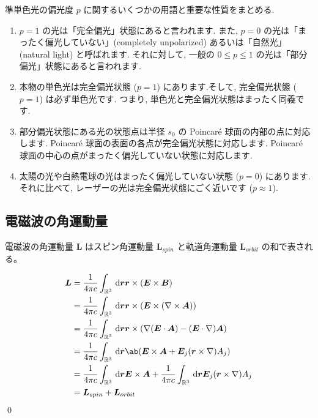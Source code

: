\documentclass[uplatex,dvipdfmx,a4paper,11pt]{jlreq}
\makeatletter
\newcommand{\RR}{\mathbb{R}}
\newcommand{\EE}{\bm{E}}
\newcommand{\BB}{\bm{B}}
\renewcommand{\AA}{\bm{A}}
\newcommand{\rr}{\bm{r}}
\newcommand{\LL}{\bm{L}}
\newcommand{\vnabla}{\mathbf{\nabla}}
\theoremstyle{definition}
\renewenvironment{proof}[1][\proofname]{\par
  \normalfont
  \topsep6\p@\@plus6\p@ \trivlist
  \item[\hskip\labelsep{\bfseries #1}\@addpunct{\bfseries}]\ignorespaces\quad\par
}{%
  \qed\endtrivlist\@endpefalse
}
\renewcommand\proofname{証明}
\makeatother
\begin{document}
準単色光の偏光度 $p$ に関するいくつかの用語と重要な性質をまとめる.
\begin{enumerate}
  \item $p = 1$ の光は「完全偏光」状態にあると言われます. また, $p = 0$ の光は「まったく偏光していない」(completely unpolarized) あるいは「自然光」(natural light) と呼ばれます. それに対して, 一般の $0 \leq p \leq 1$ の光は「部分偏光」状態にあると言われます.
  \item 本物の単色光は完全偏光状態 ($p = 1$) にあります.そして, 完全偏光状態 ($p = 1$) は必ず単色光です. つまり, 単色光と完全偏光状態はまったく同義です.
  \item 部分偏光状態にある光の状態点は半径 $s_0$ の Poincaré 球面の内部の点に対応します. Poincaré 球面の表面の各点が完全偏光状態に対応します. Poincaré 球面の中心の点がまったく偏光していない状態に対応します.
  \item 太陽の光や白熱電球の光はまったく偏光していない状態 ($p = 0$) にあります. それに比べて, レーザーの光は完全偏光状態にごく近いです ($p \approx 1$).
\end{enumerate}

\subsection{電磁波の角運動量}
\begin{theorem}
  電磁波の角運動量 $\LL$ はスピン角運動量 $\LL_{spin}$ と軌道角運動量 $\LL_{orbit}$ の和で表される。
\end{theorem}
\begin{proof}
  \begin{align}
    \LL & = \frac{1}{4\pi c}\int_{\RR^3}\dl{\rr}\rr\times(\EE\times\BB)                                                       \\
        & = \frac{1}{4\pi c}\int_{\RR^3}\dl{\rr}\rr\times(\EE\times(\vnabla\times\AA))                                        \\
        & = \frac{1}{4\pi c}\int_{\RR^3}\dl{\rr}\rr\times(\vnabla(\EE\cdot\AA) - (\EE\cdot\vnabla)\AA)                        \\
        & = \frac{1}{4\pi c}\int_{\RR^3}\dl{\rr}\ab(\EE\times\AA + \EE_j(\rr\times\vnabla)A_j)                                \\
        & = \frac{1}{4\pi c}\int_{\RR^3}\dl{\rr}\EE\times\AA + \frac{1}{4\pi c}\int_{\RR^3}\dl{\rr}\EE_j(\rr\times\vnabla)A_j \\
        & = \LL_{spin} + \LL_{orbit}
  \end{align}
\end{proof}
\end{document}
